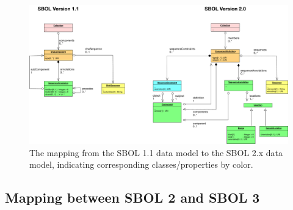 \begin{figure}[h]
\begin{center}
  \includegraphics[width=\textwidth]{images/sbol_v1_to_v2}
\end{center}
\caption{\label{SBOL1TO2}The mapping from the SBOL 1.1 data model to the SBOL 2.x  data model, indicating corresponding classes/properties by color.}
\end{figure}

\subsection{Mapping between SBOL 2 and SBOL 3}

